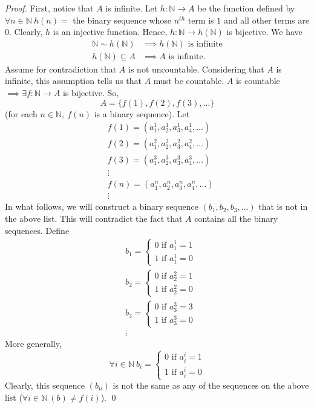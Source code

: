 \begin{proof}
    First, notice that $A$ is infinite. Let $h:\mathbb{N} \rightarrow A$ be the function defined by $\forall n\in \mathbb{N} ~h(n) =$ the binary sequence whose $n^{th}$ term is $1$ and all other terms are $0$. Clearly, $h$ is an injective function. Hence, $h:\mathbb{N} \rightarrow h(\mathbb{N})$ is bijective. We have
    \begin{align*}
        \mathbb{N} \sim h(\mathbb{N}) &\implies h(\mathbb{N}) \text{ is infinite} \\
        h(\mathbb{N}) \subseteq A &\implies A \text{ is infinite.}
    \end{align*}
    Assume for contradiction that $A$ is not uncountable. Considering that $A$ is infinite, this assumption tells us that $A$ must be countable. $A$ is countable $\implies \exists f:\mathbb{N} \rightarrow A$ is bijective. So,
    $$ A = \{f(1), f(2), f(3),…\}$$
    (for each $n\in\mathbb{N}, ~f(n)$ is a binary sequence). Let
    \begin{align*}
        &f(1)=(a_1^1, a_2^1, a_3^1, a_4^1,…) \\
        &f(2)=(a_1^2, a_2^2, a_3^2,a_4^2,…) \\
        &f(3)=(a_1^3, a_2^3, a_3^3, a_4^3,…) \\
        &\vdots \\
        &f(n)=(a_1^n, a_2^n, a_3^n, a_4^n,…) \\
        &\vdots
    \end{align*}
    In what follows, we will construct a binary sequence $(b_1, b_2, b_3,…)$ that is not in the above list. This will contradict the fact that $A$ contains all the binary sequences. Define
    \begin{align*}
        &b_1=\begin{cases}
            0 \text{ if } a_1^1=1 \\
        1 \text{ if } a_1^1=0
        \end{cases} \\
        &b_2=\begin{cases}
            0 \text{ if } a_2^2=1 \\
        1 \text{ if } a_2^2=0
        \end{cases} \\
        &b_3=\begin{cases}
            0 \text{ if } a_3^3=3 \\
            1 \text{ if } a_3^3=0
        \end{cases} \\
        &\vdots
    \end{align*}
    More generally,
    $$\forall i \in \mathbb{N} ~b_i =
    \begin{cases}
        0 \text{ if } a_i^i = 1 \\
        1 \text{ if } a_i^i = 0
    \end{cases}$$
    Clearly, this sequence $(b_n)$ is not the same as any of the sequences on the above list ($\forall i \in \mathbb{N} ~(b) \not = f(i)$). \qed
\end{proof}
